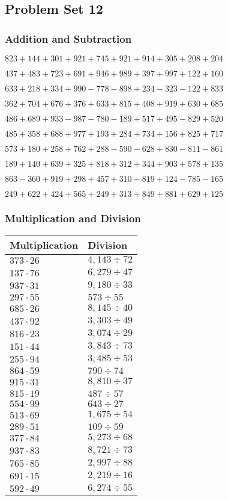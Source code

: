 \hypertarget{problem-set-12-2}{%
\subsection{Problem Set 12}\label{problem-set-12-2}}

\hypertarget{addition-and-subtraction-112}{%
\subsubsection{Addition and
Subtraction}\label{addition-and-subtraction-112}}

\(823 + 144 + 301 + 921 + 745 + 921 + 914 + 305 + 208 + 204\)

\(437 + 483 + 723 + 691 + 946 + 989 + 397 + 997 + 122 + 160\)

\(633 + 218 + 334 + 990 - 778 - 898 + 234 - 323 - 122 + 833\)

\(362 + 704 + 676 + 376 + 633 + 815 + 408 + 919 + 630 + 685\)

\(486 + 689 + 933 - 987 - 780 - 189 + 517 + 495 - 829 + 520\)

\(485 + 358 + 688 + 977 + 193 + 284 + 734 + 156 + 825 + 717\)

\(573 + 180 + 258 + 762 + 288 - 590 - 628 + 830 - 811 - 861\)

\(189 + 140 + 639 + 325 + 818 + 312 + 344 + 903 + 578 + 135\)

\(863 - 360 + 919 + 298 + 457 + 310 - 819 + 124 - 785 - 165\)

\(249 + 622 + 424 + 565 + 249 + 313 + 849 + 881 + 629 + 125\)

\hypertarget{multiplication-and-division-112}{%
\subsubsection{Multiplication and
Division}\label{multiplication-and-division-112}}

\begin{longtable}[]{@{}ll@{}}
\toprule
Multiplication & Division\tabularnewline
\midrule
\endhead
\(373 \cdot 26\) & \(4,143÷72\)\tabularnewline
\(137 \cdot 76\) & \(6,279÷47\)\tabularnewline
\(937 \cdot 31\) & \(9,180÷33\)\tabularnewline
\(297 \cdot 55\) & \(573÷55\)\tabularnewline
\(685 \cdot 26\) & \(8,145÷40\)\tabularnewline
\(437 \cdot 92\) & \(3,303÷49\)\tabularnewline
\(816 \cdot 23\) & \(3,074÷29\)\tabularnewline
\(151 \cdot 44\) & \(3,843÷73\)\tabularnewline
\(255 \cdot 94\) & \(3,485÷53\)\tabularnewline
\(864 \cdot 59\) & \(790÷74\)\tabularnewline
\(915 \cdot 31\) & \(8,810÷37\)\tabularnewline
\(815 \cdot 19\) & \(487÷57\)\tabularnewline
\(554 \cdot 99\) & \(643÷27\)\tabularnewline
\(513 \cdot 69\) & \(1,675÷54\)\tabularnewline
\(289 \cdot 51\) & \(109÷59\)\tabularnewline
\(377 \cdot 84\) & \(5,273÷68\)\tabularnewline
\(937 \cdot 83\) & \(8,721÷73\)\tabularnewline
\(765 \cdot 85\) & \(2,997÷88\)\tabularnewline
\(691 \cdot 15\) & \(2,219 ÷16\)\tabularnewline
\(592 \cdot 49\) & \(6,274÷55\)\tabularnewline
\bottomrule
\end{longtable}

